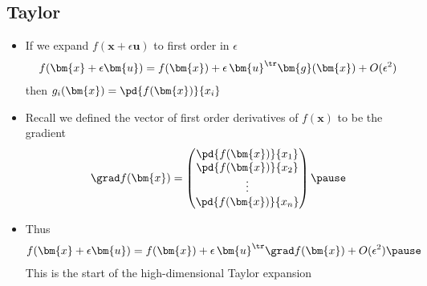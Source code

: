 
\begin{slide}
\section[-2]{Taylor}

\begin{PauseHighLight}
  \begin{itemize}
  \item If we expand $f(\bm{x}+ \epsilon \bm{u})$ to first order in $\epsilon$
    \begin{align*}
      f(\bm{x}+ \epsilon \bm{u})  = f(\bm{x})  + \epsilon \,
      \bm{u}^\tr \bm{g}(\bm{x}) + O(\epsilon^2)
    \end{align*}
    then $g_i(\bm{x}) = \pd{f(\bm{x})}{x_i}$\pause
  \item Recall we defined the vector of first order derivatives of
    $f(\bm{x})$ to be the gradient
  \vspace{-1cm}
    {\small
    \begin{align*}
      \grad f(\bm{x})  =
      \begin{pmatrix}
        \pd{f(\bm{x})}{x_1} \\ \pd{f(\bm{x})}{x_2}  \\ \vdots \\ \pd{f(\bm{x})}{x_n} 
      \end{pmatrix}\pause
    \end{align*}}
  \vspace{-3cm}
  
  \item Thus
     \begin{align*}
      f(\bm{x}+ \epsilon \bm{u})  = f(\bm{x})  + \epsilon \,
      \bm{u}^\tr \grad f(\bm{x})  + O(\epsilon^2)\pause
     \end{align*}
     This is the start of the high-dimensional Taylor expansion\pauseb
  \end{itemize}
\end{PauseHighLight}

\end{slide}


